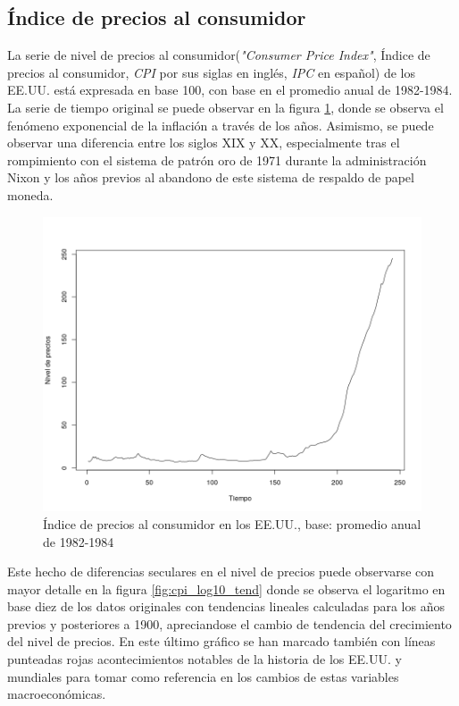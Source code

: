 \documentclass[a4paper]{article}
\begin{document}
\subsection{Índice de precios al consumidor}
La serie de nivel de precios al consumidor(\textit{"Consumer Price Index"}, Índice de precios al consumidor, \textit{CPI} por sus siglas en inglés, \textit{IPC} en español) de los EE.UU. está expresada en base 100, con base en el promedio anual de 1982-1984. La serie de tiempo original se puede observar en la figura \ref{fig:cpi_orig}, donde se observa el fenómeno exponencial de la inflación a través de los años. Asimismo, se puede observar una diferencia entre los siglos XIX y XX, especialmente tras el rompimiento con el sistema de patrón oro de 1971 durante la administración Nixon y los años previos al abandono de este sistema de respaldo de papel moneda.

\begin{figure}[H]
	\centering
	\includegraphics[width=0.8\linewidth]{cpi_orig.png}
	\caption{Índice de precios al consumidor en los EE.UU., base: promedio anual de 1982-1984} 	
	\label{fig:cpi_orig}
\end{figure}


Este hecho de diferencias seculares en el nivel de precios puede observarse con mayor detalle en la figura \ref{fig:cpi_log10_tend} donde se observa el logaritmo en base diez de los datos originales con tendencias lineales calculadas para los años previos y posteriores a 1900, apreciandose el cambio de tendencia del crecimiento del nivel de precios. En este último gráfico se han marcado también con líneas punteadas rojas acontecimientos notables de la historia de los EE.UU. y mundiales para tomar como referencia en los cambios de estas variables macroeconómicas.
\end{document}
